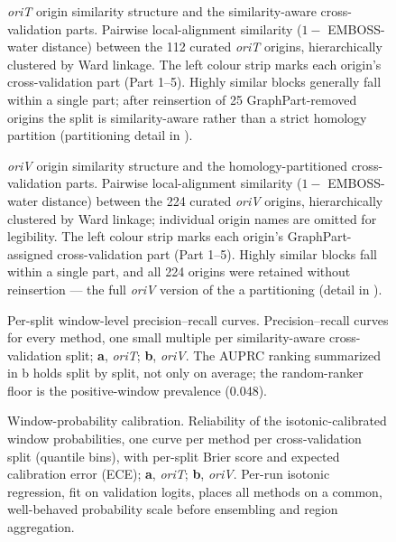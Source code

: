 \begin{figure}[h]
    \centering
\caption{
\emph{oriT} origin similarity structure and the similarity-aware cross-validation parts. Pairwise local-alignment similarity ($1 -$ EMBOSS-water distance) between the 112 curated \emph{oriT} origins, hierarchically clustered by Ward linkage. The left colour strip marks each origin's cross-validation part (Part 1--5). Highly similar blocks generally fall within a single part; after reinsertion of 25 GraphPart-removed origins the split is similarity-aware rather than a strict homology partition (partitioning detail in ).
}
\label{fig:supp-clustermap-orit}
\end{figure}

\begin{figure}[h]
    \centering
\caption{
\emph{oriV} origin similarity structure and the homology-partitioned cross-validation parts. Pairwise local-alignment similarity ($1 -$ EMBOSS-water distance) between the 224 curated \emph{oriV} origins, hierarchically clustered by Ward linkage; individual origin names are omitted for legibility. The left colour strip marks each origin's GraphPart-assigned cross-validation part (Part 1--5). Highly similar blocks fall within a single part, and all 224 origins were retained without reinsertion --- the full \emph{oriV} version of the a partitioning (detail in ).
}
\label{fig:supp-clustermap-oriv}
\end{figure}



\begin{figure}[h]
    \centering
\caption{
Per-split window-level precision--recall curves. Precision--recall curves for every method, one small multiple per similarity-aware cross-validation split; \textbf{a}, \emph{oriT}; \textbf{b}, \emph{oriV}. The AUPRC ranking summarized in b holds split by split, not only on average; the random-ranker floor is the positive-window prevalence (0.048).
}
\label{fig:supp-prcurves}
\end{figure}

\begin{figure}[h]
    \centering
\caption{
Window-probability calibration. Reliability of the isotonic-calibrated window probabilities, one curve per method per cross-validation split (quantile bins), with per-split Brier score and expected calibration error (ECE); \textbf{a}, \emph{oriT}; \textbf{b}, \emph{oriV}. Per-run isotonic regression, fit on validation logits, places all methods on a common, well-behaved probability scale before ensembling and region aggregation.
}
\label{fig:supp-reliability}
\end{figure}

